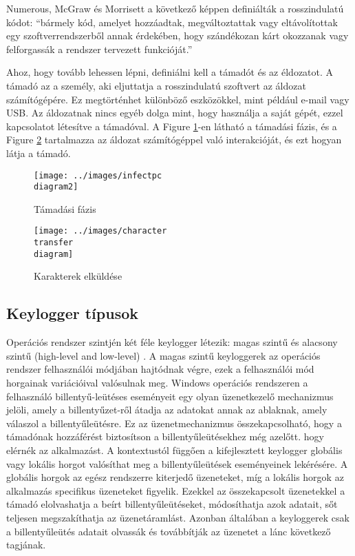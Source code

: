 \documentclass[a4paper, 11pt]{article}
\begin{document}
Numerous, McGraw és Morrisett a következő képpen definiálták a rosszindulatú kódot: \cite{ahmed2014survey} ``bármely kód, amelyet hozzáadtak, megváltoztattak vagy eltávolítottak egy szoftverrendszerből annak érdekében, hogy szándékozan kárt okozzanak vagy felforgassák a rendszer tervezett funkcióját.''

Ahoz, hogy tovább lehessen lépni, definiálni kell a támadót és az éldozatot. A támadó az a személy, aki eljuttatja a rosszindulatú szoftvert az áldozat számítógépére. Ez megtörténhet különböző eszközökkel, mint például e-mail vagy USB. Az áldozatnak nincs egyéb dolga mint, hogy használja a saját gépét, ezzel kapcsolatot létesítve a támadóval. A Figure \ref{fig:infectpcdia}-en látható a támadási fázis, és a Figure \ref{fig:chartransferdia} tartalmazza az áldozat számítógéppel való interakcióját, és ezt hogyan látja a támadó.

\begin{figure}[H]
\centering
\texttt{[image: ../images/infectpc\\ diagram2]}
\caption{Támadási fázis}
\label{fig:infectpcdia}
\end{figure}

\begin{figure}[H]
\centering
\texttt{[image: ../images/character\\ transfer\\ diagram]}
\caption{Karakterek elküldése}
\label{fig:chartransferdia}
\end{figure}

\subsection{Keylogger típusok}
Operációs rendszer szintjén két féle keylogger létezik: magas szintű és alacsony szintű (high-level and low-level) \cite{wood2010keyloggers}. A magas szintű keyloggerek az operációs rendszer felhasználói módjában hajtódnak végre, ezek a felhasználói mód horgainak variációival valósulnak meg. Windows operációs rendszeren a felhasználó billentyű-leütéses eseményeit egy olyan üzenetkezelő mechanizmus jelöli, amely a billentyűzet-ről átadja az adatokat annak az ablaknak, amely válaszol a billentyűleütésre. Ez az üzenetmechanizmus összekapcsolható, hogy a támadónak hozzáférést biztosítson a billentyűleütésekhez még azelőtt. hogy elérnék az alkalmazást. A kontextustól függően a kifejlesztett keylogger globális vagy lokális horgot valósíthat meg a billentyűleütések eseményeinek lekérésére. A globális horgok az egész rendszerre kiterjedő üzeneteket, míg a lokális horgok az alkalmazás specifikus üzeneteket figyelik. Ezekkel az összekapcsolt üzenetekkel a támadó elolvashatja a beírt billentyűleütéseket, módosíthatja azok adatait, sőt teljesen megszakíthatja az üzenetáramlást. Azonban általában a keyloggerek csak a billentyűleütés adatait olvassák és továbbítják az üzenetet a lánc következő tagjának.
\end{document}

